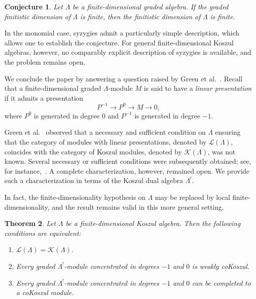 \documentclass[11pt]{article}
\newtheorem{theorem}{Theorem}[section]
\newtheorem{conjecture}[theorem]{Conjecture}
\theoremstyle{definition}
\theoremstyle{remark}
\begin{document}
\begin{conjecture}
Let \(\Lambda\) be a finite-dimensional graded algebra. If the graded finitistic dimension of \(\Lambda\) is finite, then the finitistic dimension of \(\Lambda\) is finite.
\end{conjecture}

In the monomial case, syzygies admit a particularly simple description, which allows one to establish the conjecture. For general finite-dimensional Koszul algebras, however, no comparably explicit description of syzygies is available, and the problem remains open.

\medskip 

We conclude the paper by answering a question raised by Green et al.~\cite{12}. Recall that a finite-dimensional graded \(\Lambda\)-module \(M\) is said to have a \emph{linear presentation} if it admits a presentation
\[
P^{-1}\longrightarrow P^{0}\longrightarrow M\longrightarrow 0,
\]
where \(P^{0}\) is generated in degree \(0\) and \(P^{-1}\) is generated in degree \(-1\).

\medskip 

Green et al.~\cite{12} observed that a necessary and sufficient condition on
\(\Lambda\) ensuring that the category of modules with linear presentations,
denoted by \(\mathcal{L}(\Lambda)\), coincides with the category of Koszul
modules, denoted by \(\mathcal{K}(\Lambda)\), was not known. Several necessary
or sufficient conditions were subsequently obtained; see, for
instance,~\cite{1,13}. A complete characterization, however, remained open.
We provide such a characterization in terms of the Koszul dual algebra
\(\Lambda^{!}\).

In fact, the finite-dimensionality hypothesis on \(\Lambda\) may be replaced
by local finite-dimensionality, and the result remains valid in this more
general setting.

\begin{theorem}
Let \(\Lambda\) be a finite-dimensional Koszul algebra. Then the following
conditions are equivalent:
\begin{enumerate}
\item[(a)] \(\mathcal{L}(\Lambda)=\mathcal{K}(\Lambda)\).

\item[(b)] Every graded \(\Lambda^{!}\)-module concentrated in degrees
\(-1\) and \(0\) is weakly coKoszul.

\item[(c)] Every graded \(\Lambda^{!}\)-module concentrated in degrees
\(-1\) and \(0\) can be completed to a coKoszul module.
\end{enumerate}
\end{theorem}
\end{document}
